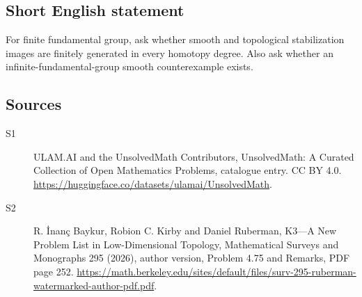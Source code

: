 \documentclass[11pt]{article}
\begin{document}
\subsection{Short English statement}
For finite fundamental group, ask whether smooth and topological stabilization images are finitely generated in every homotopy degree. Also ask whether an infinite-fundamental-group smooth counterexample exists.
\subsection{Sources}
\begin{description}
\item[\hypertarget{source:statement:1}{S1}] ULAM.AI and the UnsolvedMath Contributors, UnsolvedMath: A Curated Collection of Open Mathematics Problems, catalogue entry. CC BY 4.0. \url{https://huggingface.co/datasets/ulamai/UnsolvedMath}.
\item[\hypertarget{source:statement:2}{S2}] R. İnanç Baykur, Robion C. Kirby and Daniel Ruberman, K3—A New Problem List in Low-Dimensional Topology, Mathematical Surveys and Monographs 295 (2026), author version, Problem 4.75 and Remarks, PDF page 252. \url{https://math.berkeley.edu/sites/default/files/surv-295-ruberman-watermarked-author-pdf.pdf}.
\end{description}
\label{end:statement}
\end{document}
